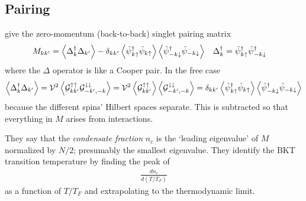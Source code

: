 \subsection{Pairing}\label{sec:pairing}

 give the zero-momentum (back-to-back) singlet pairing matrix
\begin{align}
    M_{kk'} &=
    \left\langle \Delta{}^{\dagger}_k \Delta_{k'} \right\rangle
    -   \delta_{kk'}
        \left\langle \tilde{\psi}{}^{\dagger}_{k\uparrow} \tilde{\psi}_{k\uparrow} \right\rangle
        \left\langle \tilde{\psi}{}^{\dagger}_{-k\downarrow} \tilde{\psi}_{-k\downarrow} \right\rangle
    &
    \Delta{}^{\dagger}_k &= \tilde{\psi}{}^{\dagger}_{k\uparrow} \tilde{\psi}{}^{\dagger}_{-k\downarrow}
    \label{eq:PRL129076403 pairing}
\end{align}
where the $\Delta$ operator is like a Cooper pair.
In the free case
\begin{align}
    \left\langle \Delta{}^{\dagger}_k \Delta_{k'} \right\rangle
    =
    \mathcal{V}^2\left\langle  \mathcal{G}^{\uparrow\uparrow}_{kk'} \mathcal{G}^{\downarrow\downarrow}_{-k',-k}  \right\rangle
    =
    \mathcal{V}^2\left\langle  \mathcal{G}^{\uparrow\uparrow}_{kk'}  \right\rangle \left\langle  \mathcal{G}^{\downarrow\downarrow}_{-k',-k}  \right\rangle
    =
    \delta_{kk'}
    \left\langle \tilde{\psi}{}^{\dagger}_{k\uparrow} \tilde{\psi}_{k\uparrow} \right\rangle
    \left\langle \tilde{\psi}{}^{\dagger}_{-k\downarrow} \tilde{\psi}_{-k\downarrow} \right\rangle
\end{align}
because the different spins' Hilbert spaces separate.
This is subtracted so that everything in $M$ arises from interactions.

They say that the \emph{condensate fraction} $n_c$ is the `leading eigenvalue' of $M$ normalized by $N/2$; presumably the smallest eigenvalue.
They identify the BKT transition temperature by finding the peak of
\begin{align}
    \frac{d n_c}{d(T/T_F)}
\end{align}
as a function of $T/T_F$ and extrapolating to the thermodynamic limit.


